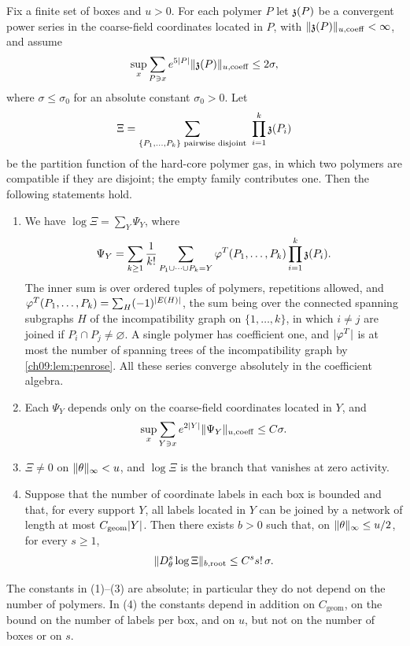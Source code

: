 \begin{theorem}\label{ch09:thm:hard-core-log}
Fix a finite set of boxes and $u>0$. For each polymer $P$ let $\mathfrak z(P)$ be a convergent power series in the coarse-field coordinates located in $P$, with $\lVert \mathfrak z(P)\rVert_{u,\mathrm{coeff}}<\infty$, and assume
\begin{equation}\label{ch09:eq:activity-bound}
 \sup_x\sum_{P\ni x}e^{5\lvert P\rvert}\lVert \mathfrak z(P)\rVert_{u,\mathrm{coeff}}\le2\sigma,
\end{equation}
where $\sigma\le\sigma_0$ for an absolute constant $\sigma_0>0$. Let
\[
 \Xi=\sum_{\{P_1,\ldots,P_k\}\text{ pairwise disjoint}}\ \prod_{i=1}^k\mathfrak z(P_i)
\]
be the partition function of the hard-core polymer gas, in which two polymers are compatible if they are disjoint; the empty family contributes one. Then the following statements hold.
\begin{enumerate}
\item We have $\log\Xi=\sum_Y\Psi_Y$, where
\[
 \Psi_Y=\sum_{k\ge1}\frac1{k!}\sum_{P_1\cup\cdots\cup P_k=Y}\varphi^T(P_1,\ldots,P_k)\prod_{i=1}^k\mathfrak z(P_i).
\]
The inner sum is over ordered tuples of polymers, repetitions allowed, and $\varphi^T(P_1,\ldots,P_k)=\sum_H(-1)^{\lvert E(H)\rvert}$, the sum being over the connected spanning subgraphs $H$ of the incompatibility graph on $\{1,\ldots,k\}$, in which $i\ne j$ are joined if $P_i\cap P_j\ne\varnothing$. A single polymer has coefficient one, and $\lvert \varphi^T\rvert$ is at most the number of spanning trees of the incompatibility graph by \cref{ch09:lem:penrose}. All these series converge absolutely in the coefficient algebra.
\item Each $\Psi_Y$ depends only on the coarse-field coordinates located in $Y$, and
\[
 \sup_x\sum_{Y\ni x}e^{2\lvert Y\rvert}\lVert \Psi_Y\rVert_{u,\mathrm{coeff}}\le C\sigma.
\]
\item $\Xi\ne0$ on $\lVert \theta\rVert_\infty<u$, and $\log\Xi$ is the branch that vanishes at zero activity.
\item Suppose that the number of coordinate labels in each box is bounded and that, for every support $Y$, all labels located in $Y$ can be joined by a network of length at most $C_{\mathrm{geom}}\lvert Y\rvert$. Then there exists $b>0$ such that, on $\lVert \theta\rVert_\infty\le u/2$, for every $s\ge1$,
\[
 \lVert D_\theta^s\log\Xi\rVert_{b,\mathrm{root}}\le C^ss!\,\sigma.
\]
\end{enumerate}
The constants in (1)--(3) are absolute; in particular they do not depend on the number of polymers. In (4) the constants depend in addition on $C_{\mathrm{geom}}$, on the bound on the number of labels per box, and on $u$, but not on the number of boxes or on $s$.
\end{theorem}

